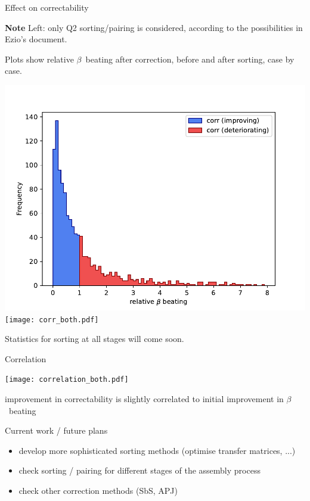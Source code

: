\documentclass[usenames,dvipsnames,aspectratio=169,table]{beamer}
\begin{document}
\begin{frame} %
    {Effect on correctability}


    \textbf{Note} Left: only Q2 sorting/pairing is considered, according to the possibilities in Ezio's document.

    Plots show relative $\beta$~beating after correction, before and after sorting, case by case.
    
    
    \includegraphics[width=0.45\linewidth]{corr_onlyQ2.pdf}
    \hfill
    \texttt{[image: corr\_both.pdf]}

    Statistics for sorting at all stages will come soon.

\end{frame} %


\begin{frame} %
    {Correlation}

    \begin{minipage}{0.6\linewidth}
        \texttt{[image: correlation\_both.pdf]} 
    \end{minipage}
    \begin{minipage}{0.39\linewidth}
        improvement in correctability is slightly correlated to initial improvement in $\beta$~beating 
    \end{minipage}
    
\end{frame} %


\begin{frame} %
    {Current work / future plans}


    \begin{itemize}
        \item develop more sophisticated sorting methods (optimise transfer matrices, ...)
        \item check sorting / pairing for different stages of the assembly process
        \item check other correction methods (SbS, APJ)
    \end{itemize}
    
\end{frame} %
\end{document}
